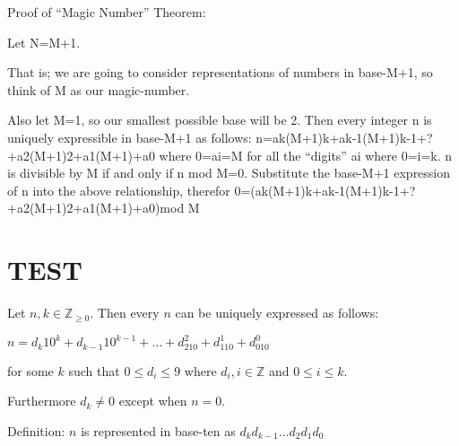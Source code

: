 \documentclass{article}
\newenvironment{jprIn}{\begin{adjustwidth}{2em}{}}{\end{adjustwidth}}
\begin{document}
Proof of ``Magic Number'' Theorem:

Let N=M+1.

That is; we are going to consider representations of numbers in base-M+1, so think of M as our magic-number.

Also let M=1, so our smallest possible base will be 2.
Then every integer n is uniquely expressible in base-M+1 as follows:
n=ak(M+1)k+ak-1(M+1)k-1+?+a2(M+1)2+a1(M+1)+a0
where 0=ai=M for all the ``digits'' ai where 0=i=k.
n is divisible by M if and only if n mod M=0. 
Substitute the base-M+1 expression of n into the above relationship, therefor
0=(ak(M+1)k+ak-1(M+1)k-1+?+a2(M+1)2+a1(M+1)+a0)mod M


\section*{TEST}

\begin{jprIn}
Let $n,k\in \mathbb{Z}_{\ge 0}$. Then every $n$ can be uniquely expressed as follows:

\hspace{3em}$n=d_k10^k+d_{k-1}10^{k-1}+\dots+d_210^2+d_110^1+d_010^0$

for some $k$ such that $0 \le d_i \le 9$ where $d_i,i\in\mathbb{Z}$ and $0 \le i \le k$.

Furthermore $d_k\ne0$ except when $n=0$.

Definition: $n$ is represented in base-ten as $d_kd_{k-1}\dots{}d_2d_1d_0$
\end{jprIn}
\bigskip
\end{document}
